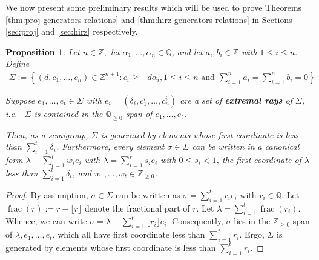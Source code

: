 \documentclass{amsart}
\theoremstyle{plain}
\newtheorem{prop}[thm]{Proposition}
\theoremstyle{definition}
\theoremstyle{remark}
\numberwithin{equation}{section}
\newcommand\bq{{\mathbb Q}}
\newcommand\bz{{\mathbb Z}}
\newcommand\pdeg{\delta}
\DeclareMathOperator{\fr}{frac}
\begin{document}
We now present some preliminary results which will be used to prove Theorems \ref{thm:proj-generators-relations} and \ref{thm:hirz-generators-relations} in Sections \ref{sec:proj} and \ref{sec:hirz} respectively.

\begin{prop}
\label{prop:cone-generation}
Let $n \in \bz,$ let $\alpha_1, \ldots, \alpha_n \in \bq$, and let
$a_i, b_i \in \bz$ with $1 \leq i \leq n.$ Define
\begin{align*}
	\Sigma := \left \{(d, c_1, \ldots, c_n) \in \bz^{n + 1} : c_i \geq -
	d \alpha_i, 1 \leq i \leq n \text{ and } \sum_{i = 1}^{n} a_i =
	\sum_{i	= 1}^{n}b_i = 0 \right \}
\end{align*}

\noindent
Suppose $e_1, \ldots, e_t \in \Sigma$ with $e_i = (\pdeg_i, c_1^i,
\ldots, c_n^i)$ are a set of {\bf extremal rays} of $\Sigma$,
i.e.~ $\Sigma$ is contained in the $\bq_{\geq 0}$ span of
$e_1, \ldots, e_t$.

Then, as a semigroup, $\Sigma$ is generated by
elements whose first coordinate is less than $\sum_{i = 1}^{t}
\pdeg_i$. Furthermore, every element $\sigma \in \Sigma$ can be
written in a canonical form $\lambda + \sum_{i = 1}^{t} w_i e_i$ 
with $\lambda = \sum_{i = 1}^{r} s_i e_i$ with $0 \leq s_i < 1$, the
first coordinate of $\lambda$ less than $\sum_{i=1}^{t}\pdeg_i$,
and $w_1, \ldots, w_t \in \bz_{\geq 0}$.
\end{prop}

\begin{proof}
By assumption, $\sigma \in \Sigma$ can be written as $\sigma = \sum_
{i = 1}^{t} r_i e_i$ with $r_i \in \bq$. Let $\fr(r) := r - \lfloor r
\rfloor$ denote the fractional part of $r$. Let $\lambda = \sum_{i = 1}
^{t} \fr(r_i)$. Whence, we can write $\sigma = \lambda + \sum_{i = 1}
^{t} \lfloor r_i \rfloor e_i.$ Consequently, $\sigma$ lies in the
$\bz_{\geq 0}$ span of $\lambda, e_1, \ldots, e_t$, which all have
first coordinate less than $\sum_{i=1}^{t} r_i$. Ergo, $\Sigma$ is
generated by elements whose first coordinate is less than
$\sum_{i = 1}^{t} r_i$.
\end{proof}
\end{document}
